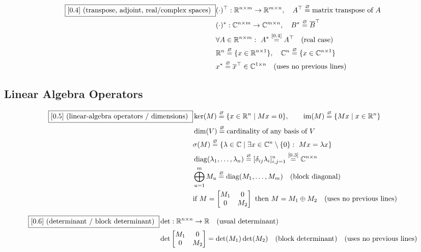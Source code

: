\documentclass[11pt]{article}
\newcommand{\eqdef}{\overset{\varnothing}{=}}
\newcommand{\eqref}[1]{\overset{[#1]}{=}}
\begin{document}
\begin{align}
\boxed{[0.4] \text{ (transpose, adjoint, real/complex spaces) }}
&(\cdot)^\top :
\mathbb{R}^{n\times m}\to\mathbb{R}^{m\times n},
\quad
A^\top \eqdef
\text{matrix transpose of }A \notag\\
&(\cdot)^* :
\mathbb{C}^{n\times m}\to\mathbb{C}^{m\times n},
\quad
B^* \eqdef
\overline{B}^\top \notag\\
&\forall A\in\mathbb{R}^{n\times m}:\
A^*
\eqref{0.4}
A^\top
\quad(\text{real case}) \notag\\
&\mathbb{R}^n
\eqdef
\{x\in\mathbb{R}^{n\times 1}\},
\quad
\mathbb{C}^n
\eqdef
\{x\in\mathbb{C}^{n\times 1}\} \notag\\
&x^*
\eqdef
\overline{x}^\top
\in \mathbb{C}^{1\times n}
\quad(\text{uses no previous lines})
\end{align}

\subsection{Linear Algebra Operators}

\begin{align}
\boxed{[0.5] \text{ (linear-algebra operators / dimensions) }}
&\ker(M)
\eqdef
\{x \in \mathbb{R}^n \mid Mx = 0\},
\qquad
\operatorname{im}(M)
\eqdef
\{Mx \mid x \in \mathbb{R}^n\} \notag\\
&\dim(V)
\eqdef
\text{cardinality of any basis of }V \notag\\
&\sigma(M)
\eqdef
\{\lambda\in\mathbb{C} \mid \exists x\in\mathbb{C}^n\setminus\{0\}:\ Mx=\lambda x\} \notag\\
&\operatorname{diag}(\lambda_1,\dots,\lambda_n)
\eqdef
[\delta_{ij}\lambda_i]_{i,j=1}^n
\eqref{0.3}
\mathbb{C}^{n\times n} \notag\\
&\bigoplus_{u=1}^m M_u
\eqdef
\operatorname{diag}(M_1,\dots,M_m)
\quad(\text{block diagonal}) \notag\\
&\text{if }M=
\begin{bmatrix}
M_1 & 0\\
0 & M_2
\end{bmatrix}
\text{ then }
M
=
M_1 \oplus M_2
\quad(\text{uses no previous lines})
\end{align}

\begin{align}
\boxed{[0.6] \text{ (determinant / block determinant) }}
&\det:
\mathbb{R}^{n\times n}\to\mathbb{R}
\quad\text{(usual determinant)} \notag\\
&\det
\begin{bmatrix}
M_1 & 0\\
0 & M_2
\end{bmatrix}
=
\det(M_1)
\det(M_2)
\quad(\text{block determinant})
\quad(\text{uses no previous lines})
\end{align}
\end{document}
